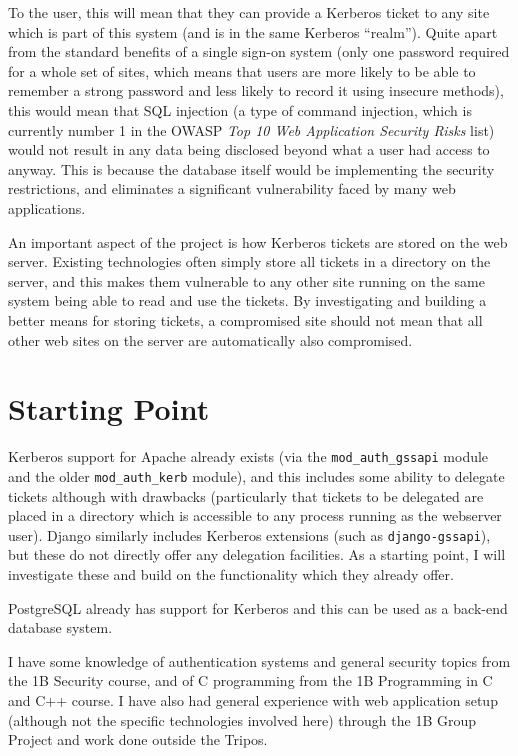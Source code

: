 \documentclass{standalone}
\begin{document}
To the user, this will mean that they can provide a Kerberos ticket to any site which is part of this system (and is in the same Kerberos ``realm''). Quite apart from the standard benefits of a single sign-on system (only one password required for a whole set of sites, which means that users are more likely to be able to remember a strong password and less likely to record it using insecure methods), this would mean that SQL injection (a type of command injection, which is currently number 1 in the OWASP \textit{Top 10 Web Application Security Risks} list) would not result in any data being disclosed beyond what a user had access to anyway. This is because the database itself would be implementing the security restrictions, and eliminates a significant vulnerability faced by many web applications.

An important aspect of the project is how Kerberos tickets are stored on the web server. Existing technologies often simply store all tickets in a directory on the server, and this makes them vulnerable to any other site running on the same system being able to read and use the tickets. By investigating and building a better means for storing tickets, a compromised site should not mean that all other web sites on the server are automatically also compromised.

\section*{Starting Point}
Kerberos support for Apache already exists (via the \verb+mod_auth_gssapi+ module and the older \verb+mod_auth_kerb+ module), and this includes some ability to delegate tickets although with drawbacks (particularly that tickets to be delegated are placed in a directory which is accessible to any process running as the webserver user). Django similarly includes Kerberos extensions (such as \verb+django-gssapi+), but these do not directly offer any delegation facilities. As a starting point, I will investigate these and build on the functionality which they already offer.

PostgreSQL already has support for Kerberos and this can be used as a back-end database system.

I have some knowledge of authentication systems and general security topics from the 1B Security course, and of C programming from the 1B Programming in C and C++ course. I have also had general experience with web application setup (although not the specific technologies involved here) through the 1B Group Project and work done outside the Tripos.
\end{document}
